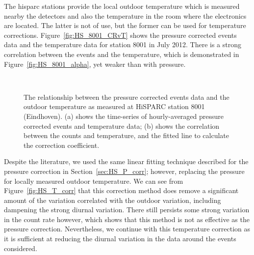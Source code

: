 The \gls{hisparc} stations provide the local outdoor temperature which is measured nearby the detectors and also the temperature in the room where the electronics are located. The latter is not of use, but the former can be used for temperature corrections. Figure~\ref{fig:HS_8001_CRvT} shows the pressure corrected events data and the temperature data for station 8001 in July 2012. There is a strong correlation between the events and the temperature, which is demonstrated in Figure~\ref{fig:HS_8001_alpha}, yet weaker than with pressure.

\begin{figure}[ht]
	\centering
	 \\
	
	\caption{The relationship between the pressure corrected events data and the outdoor temperature as measured at HiSPARC station 8001 (Eindhoven). (a) shows the time-series of hourly-averaged pressure corrected events and temperature data; (b) shows the correlation between the counts and temperature, and the fitted line to calculate the correction coefficient.}
	\label{fig:CR_V_T}
\end{figure}

Despite the literature, we used the same linear fitting technique described for the pressure correction in Section~\ref{sec:HS_P_corr}; however, replacing the pressure for locally measured outdoor temperature. We can see from Figure~\ref{fig:HS_T_corr} that this correction method does remove a significant amount of the variation correlated with the outdoor variation, including dampening the strong diurnal variation. There still persists some strong variation in the count rate however, which shows that this method is not as effective as the pressure correction. Nevertheless, we continue with this temperature correction as it is sufficient at reducing the diurnal variation in the data around the events considered.
 

